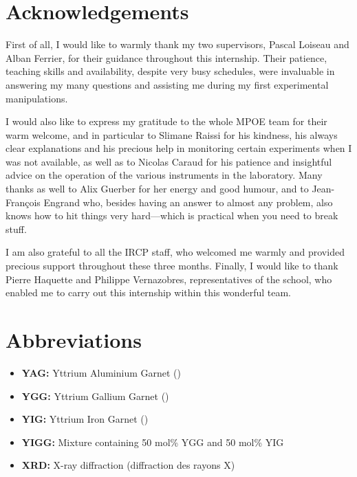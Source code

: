 \documentclass{rapportENSCP}
\begin{document}
\tabledematieres %



\section{Acknowledgements} 
First of all, I would like to warmly thank my two supervisors, Pascal Loiseau and Alban Ferrier, for their guidance throughout this internship. Their patience, teaching skills and availability, despite very busy schedules, were invaluable in answering my many questions and assisting me during my first experimental manipulations.

I would also like to express my gratitude to the whole MPOE team for their warm welcome, and in particular to Slimane Raissi for his kindness, his always clear explanations and his precious help in monitoring certain experiments when I was not available, as well as to Nicolas Caraud for his patience and insightful advice on the operation of the various instruments in the laboratory. Many thanks as well to Alix Guerber for her energy and good humour, and to Jean-François Engrand who, besides having an answer to almost any problem, also knows how to hit things very hard—which is practical when you need to break stuff.

I am also grateful to all the IRCP staff, who welcomed me warmly and provided precious support throughout these three months. Finally, I would like to thank Pierre Haquette and Philippe Vernazobres, representatives of the school, who enabled me to carry out this internship within this wonderful team.

\newpage

\section{Abbreviations}
\begin{itemize}
    \item \textbf{YAG: } Yttrium Aluminium Garnet (\YAG)
    \item \textbf{YGG: } Yttrium Gallium Garnet (\YGG)
    \item \textbf{YIG: } Yttrium Iron Garnet (\YIG)
    \item \textbf{YIGG: } Mixture containing 50 mol\% YGG and 50 mol\% YIG
    \item \textbf{XRD: } X-ray diffraction (diffraction des rayons X)
\end{itemize}
\end{document}
